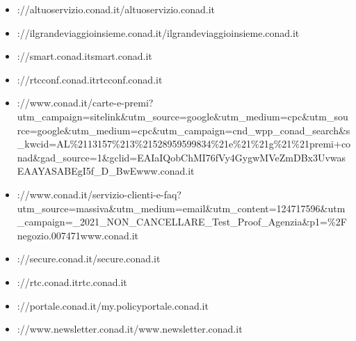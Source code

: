 \documentclass{article}
\begin{document}
\begin{itemize}
        
        
        \item \hrefhttps://altuoservizio.conad.it/altuoservizio.conad.it
    
        
        
        \item \hrefhttps://ilgrandeviaggioinsieme.conad.it/ilgrandeviaggioinsieme.conad.it
    
        
        
        \item \hrefhttp://smart.conad.itsmart.conad.it
    
        
        
        \item \hrefhttp://rtcconf.conad.itrtcconf.conad.it
    
        
        
        \item \hrefhttps://www.conad.it/carte-e-premi?utm\_campaign=sitelink\&utm\_source=google\&utm\_medium=cpc\&utm\_source=google\&utm\_medium=cpc\&utm\_campaign=cnd\_wpp\_conad\_search\&s\_kwcid=AL\%2113157\%213\%21528959599834\%21e\%21\%21g\%21\%21premi+conad\&gad\_source=1\&gclid=EAIaIQobChMI76fVy4GygwMVeZmDBx3UvwasEAAYASABEgI5f\_D\_BwEwww.conad.it
    
        
        
        \item \hrefhttps://www.conad.it/servizio-clienti-e-faq?utm\_source=massiva\&utm\_medium=email\&utm\_content=124717596\&utm\_campaign=\_2021\_NON\_CANCELLARE\_Test\_Proof\_Agenzia\&p1=\%2Fnegozio.007471www.conad.it
    
        
        
        \item \hrefhttp://secure.conad.it/secure.conad.it
    
        
        
        \item \hrefhttp://rtc.conad.itrtc.conad.it
    
        
        
        \item \hrefhttps://portale.conad.it/my.policyportale.conad.it
    
        
        
        \item \hrefhttps://www.newsletter.conad.it/www.newsletter.conad.it
    
        
        

\end{itemize}
\end{document}
